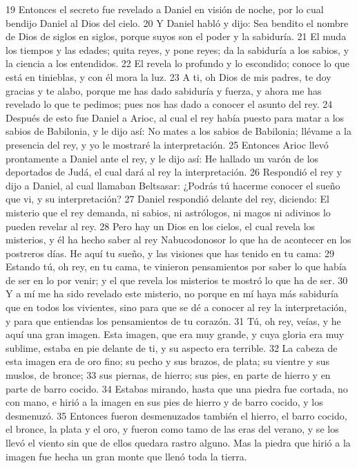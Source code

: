 19 Entonces el secreto fue revelado a Daniel en visión de noche, por lo cual bendijo Daniel al Dios del cielo.
20 Y Daniel habló y dijo: Sea bendito el nombre de Dios de siglos en siglos, porque suyos son el poder y la sabiduría.
21 El muda los tiempos y las edades; quita reyes, y pone reyes; da la sabiduría a los sabios, y la ciencia a los entendidos.
22 El revela lo profundo y lo escondido; conoce lo que está en tinieblas, y con él mora la luz.
23 A ti, oh Dios de mis padres, te doy gracias y te alabo, porque me has dado sabiduría y fuerza, y ahora me has revelado lo que te pedimos; pues nos has dado a conocer el asunto del rey.
24 Después de esto fue Daniel a Arioc, al cual el rey había puesto para matar a los sabios de Babilonia, y le dijo así: No mates a los sabios de Babilonia; llévame a la presencia del rey, y yo le mostraré la interpretación.
25 Entonces Arioc llevó prontamente a Daniel ante el rey, y le dijo así: He hallado un varón de los deportados de Judá, el cual dará al rey la interpretación.
26 Respondió el rey y dijo a Daniel, al cual llamaban Beltsasar: ¿Podrás tú hacerme conocer el sueño que vi, y su interpretación?
27 Daniel respondió delante del rey, diciendo: El misterio que el rey demanda, ni sabios, ni astrólogos, ni magos ni adivinos lo pueden revelar al rey.
28 Pero hay un Dios en los cielos, el cual revela los misterios, y él ha hecho saber al rey Nabucodonosor lo que ha de acontecer en los postreros días. He aquí tu sueño, y las visiones que has tenido en tu cama:
29 Estando tú, oh rey, en tu cama, te vinieron pensamientos por saber lo que había de ser en lo por venir; y el que revela los misterios te mostró lo que ha de ser.
30 Y a mí me ha sido revelado este misterio, no porque en mí haya más sabiduría que en todos los vivientes, sino para que se dé a conocer al rey la interpretación, y para que entiendas los pensamientos de tu corazón.
31 Tú, oh rey, veías, y he aquí una gran imagen. Esta imagen, que era muy grande, y cuya gloria era muy sublime, estaba en pie delante de ti, y su aspecto era terrible.
32 La cabeza de esta imagen era de oro fino; su pecho y sus brazos, de plata; su vientre y sus muslos, de bronce;
33 sus piernas, de hierro; sus pies, en parte de hierro y en parte de barro cocido.
34 Estabas mirando, hasta que una piedra fue cortada, no con mano, e hirió a la imagen en sus pies de hierro y de barro cocido, y los desmenuzó.
35 Entonces fueron desmenuzados también el hierro, el barro cocido, el bronce, la plata y el oro, y fueron como tamo de las eras del verano, y se los llevó el viento sin que de ellos quedara rastro alguno. Mas la piedra que hirió a la imagen fue hecha un gran monte que llenó toda la tierra.
